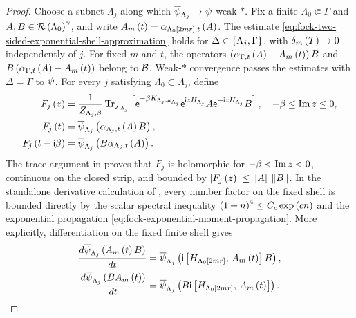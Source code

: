 \documentclass[11pt,a4paper]{article}
\theoremstyle{plain}
\theoremstyle{definition}
\theoremstyle{remark}
\begin{document}
\begin{proof}
Choose a subnet $\Lambda_j$ along which
$\oastate[\overline{\psi}_{\Lambda_j}] \to \oastate[\psi]$ weak-$\ast$.
Fix a finite $\Lambda_0\Subset\Gamma$ and
$A,B\in\fun{\oaresolventalgebra}{\Lambda_0}^{\gamma}$, and write
$\fun{A_m}{t} = \fun{\alpha_{\Lambda_0[2 m r],t}}{A}$.
The estimate \eqref{eq:fock-two-sided-exponential-shell-approximation} holds for
$\Delta\in\setone{\Lambda_j,\Gamma}$, with $\fun{\delta_m}{T}\to0$ independently of $j$.
For fixed $m$ and $t$, the operators
$\rbk{\fun{\alpha_{\Gamma,t}}{A} - \fun{A_m}{t}}B$ and
$B\rbk{\fun{\alpha_{\Gamma,t}}{A} - \fun{A_m}{t}}$ belong to $\oa{B}$.
Weak-$\ast$ convergence passes the estimates with $\Delta = \Gamma$ to $\oastate[\psi]$.
For every $j$ satisfying $\Lambda_0\subset\Lambda_j$, define
\begin{equation}
\begin{aligned}
\fun{F_j}{z}
& =
\frac{1}{Z_{\Lambda_j,\beta}}
\sqfun{\trace_{\sphilb{F}_{\Lambda_j}}}{
\napiernum^{-\beta K_{\Lambda_j,\smchemicalpotential_{\Lambda_j}}}
\napiernum^{\imunit zH_{\Lambda_j}}
A
\napiernum^{-\imunit zH_{\Lambda_j}}
B},
\quad
-\beta\leq\opimag z\leq0,
\\
\fun{F_j}{t}
& =
\fun{\oastate[\overline{\psi}_{\Lambda_j}]}{
\fun{\alpha_{\Lambda_j,t}}{A}B},
\\
\fun{F_j}{t-\imunit\beta}
& =
\fun{\oastate[\overline{\psi}_{\Lambda_j}]}{
B\fun{\alpha_{\Lambda_j,t}}{A}}.
\end{aligned}
\label{eq:fock-finite-volume-kms-strip-function}
\end{equation}
The trace argument in \cite[Lemma 5.4]{DeuchertLampartLemm001} proves that $F_j$ is holomorphic for
$-\beta<\opimag z<0$, continuous on the closed strip, and bounded by
$\abs{\fun{F_j}{z}}\leq\norm{A}\norm{B}$.
In the standalone derivative calculation of \cite[Lemma 5.5]{DeuchertLampartLemm001}, every number factor on the
fixed shell is bounded directly by the scalar spectral inequality
$\rbk{1+n}^{4}\leq C_c\fnexp{cn}$ and the exponential propagation
\eqref{eq:fock-exponential-moment-propagation}.
More explicitly, differentiation on the fixed finite shell gives
$$\begin{aligned}
\od{\fun{\oastate[\overline{\psi}_{\Lambda_j}]}{
\fun{A_m}{t}B}}{t}
& =
\fun{\oastate[\overline{\psi}_{\Lambda_j}]}{
\imunit\commutator{H_{\Lambda_0[2mr]}}{\fun{A_m}{t}}B},
\\
\od{\fun{\oastate[\overline{\psi}_{\Lambda_j}]}{
B\fun{A_m}{t}}}{t}
& =
\fun{\oastate[\overline{\psi}_{\Lambda_j}]}{
B\imunit\commutator{H_{\Lambda_0[2mr]}}{\fun{A_m}{t}}}.

\end{aligned}$$
\end{proof}
\end{document}
